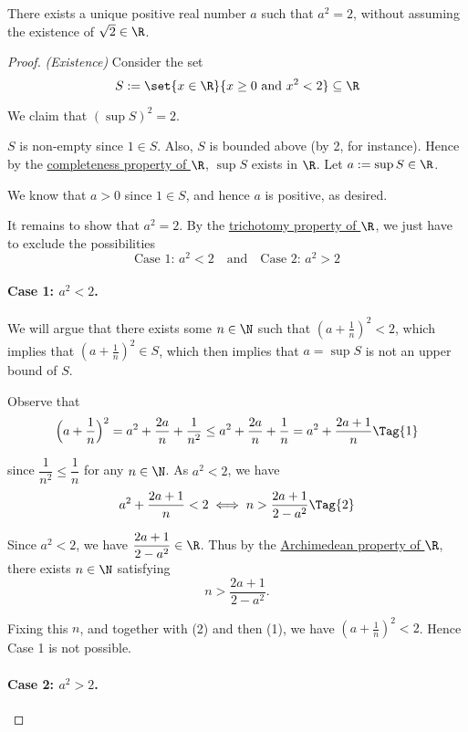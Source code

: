 \Lemma{}\label{b88beb7}

There exists a unique positive real number $a$ such that $a^2=2$, without
assuming the existence of $\sqrt2\in\R$.

\begin{proof}
  \textit{(Existence)} Consider the set
  $$
    S:=\set{x\in\R}{x\geq0\text{ and }x^2<2}\subseteq\R
  $$

  We claim that $(\sup S)^2=2$.

  $S$ is non-empty since $1\in S$. Also, $S$ is bounded above (by 2, for
  instance). Hence by the \href{f330cf9}{completeness property of $\R$}, $\sup
  S$ exists in $\R$. Let $a:=\sup S\in\R$.

  We know that $a>0$ since $1\in S$, and hence $a$ is positive, as desired.

  It remains to show that $a^2=2$. By the \href{d49c63e}{trichotomy property of
  $\R$}, we just have to exclude the possibilities
  $$
    \text{Case 1: }a^2<2\quad\text{and}\quad\text{Case 2: }a^2>2
  $$

  \paragraph{Case 1: $a^2<2$.}

  We will argue that there exists some $n\in\N$ such that $(a+\frac1n)^2<2$,
  which implies that $(a+\frac1n)^2\in S$, which then implies that $a=\sup S$
  is not an upper bound of $S$.

  Observe that
  \begin{equation*}
    \Bigl(a+\frac1n\Bigr)^2=a^2+\frac{2a}n+\frac1{n^2}\leq
    a^2+\frac{2a}n+\frac1n=a^2+\frac{2a+1}n\Tag{1}
  \end{equation*}

  since $\dfrac1{n^2}\leq\dfrac1n$ for any $n\in\N$. As $a^2<2$, we have
  \begin{equation*}
    a^2+\frac{2a+1}n<2\iff n>\frac{2a+1}{2-a^2}\Tag{2}
  \end{equation*}

  Since $a^2<2$, we have $\dfrac{2a+1}{2-a^2}\in\R$. Thus by the
  \href{fbc2289}{Archimedean property of $\R$}, there exists $n\in\N$
  satisfying
  $$
    n>\frac{2a+1}{2-a^2}.
  $$

  Fixing this $n$, and together with (2) and then (1), we have
  $(a+\frac1{n})^2<2$. Hence Case 1 is not possible.

  \paragraph{Case 2: $a^2>2$.}


\end{proof}
